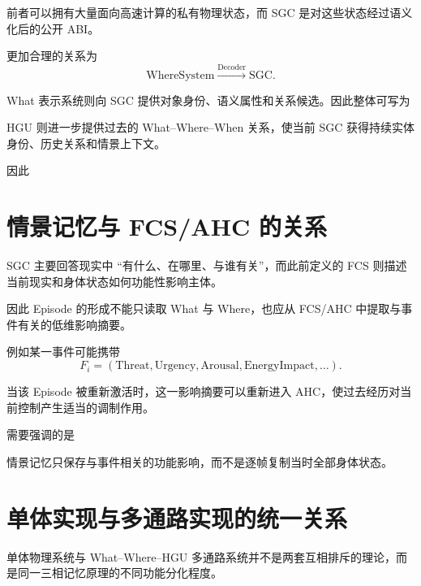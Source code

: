 前者可以拥有大量面向高速计算的私有物理状态，而 SGC 是对这些状态经过语义化后的公开 ABI。

更加合理的关系为
\[
\mathrm{WhereSystem}
\xrightarrow{\mathrm{Decoder}}
\mathrm{SGC}.
\]

What 表示系统则向 SGC 提供对象身份、语义属性和关系候选。因此整体可写为
\begin{statementbox}
\centering
{}
\end{statementbox}

HGU 则进一步提供过去的 What--Where--When 关系，使当前 SGC 获得持续实体身份、历史关系和情景上下文。

因此
\begin{statementbox}
\centering
{}
\end{statementbox}

\section{情景记忆与 FCS/AHC 的关系}

SGC 主要回答现实中 ``有什么、在哪里、与谁有关''，而此前定义的 FCS 则描述当前现实和身体状态如何功能性影响主体。

因此 Episode 的形成不能只读取 What 与 Where，也应从 FCS/AHC 中提取与事件有关的低维影响摘要。

例如某一事件可能携带
\[
F_i=
(
\mathrm{Threat},
\mathrm{Urgency},
\mathrm{Arousal},
\mathrm{EnergyImpact},
\ldots
).
\]

当该 Episode 被重新激活时，这一影响摘要可以重新进入 AHC，使过去经历对当前控制产生适当的调制作用。

需要强调的是
\begin{statementbox}
\centering
{}
\end{statementbox}

情景记忆只保存与事件相关的功能影响，而不是逐帧复制当时全部身体状态。

\section{单体实现与多通路实现的统一关系}

单体物理系统与 What--Where--HGU 多通路系统并不是两套互相排斥的理论，而是同一三相记忆原理的不同功能分化程度。


